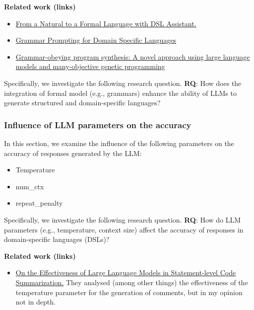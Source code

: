 \textbf{Related work (links)}
\begin{itemize}
    \item \href{https://dl.acm.org/doi/10.1145/3652620.3687811}{From a Natural to a Formal Language with DSL Assistant.}
    \item \href{https://proceedings.neurips.cc/paper_files/paper/2023/file/cd40d0d65bfebb894ccc9ea822b47fa8-Paper-Conference.pdf}{Grammar Prompting for Domain Specific Languages}
    \item \href{https://www.sciencedirect.com/science/article/abs/pii/S0920548924001077}{Grammar-obeying program synthesis: A novel approach using large language models and many-objective genetic programming}
\end{itemize}

Specifically, we investigate the following research question.
\textbf{RQ}: How does the integration of formal model (e.g., grammars) enhance the ability of LLMs to generate structured and domain-specific languages?

\subsubsection{Influence of LLM parameters on the accuracy}
In this section, we examine the influence of the following parameters on the accuracy of responses generated by the LLM:

\begin{itemize}
    \item Temperature
    \item num\_ctx
    \item repeat\_penalty
\end{itemize}

Specifically, we investigate the following research question.
\textbf{RQ}: How do LLM parameters (e.g., temperature, context size) affect the accuracy of responses in domain-specific languages (DSLs)?

\textbf{Related work (links)}
\begin{itemize}
    \item \href{https://ieeexplore.ieee.org/document/10684656}{On the Effectiveness of Large Language Models in Statement-level Code Summarization.} They analysed (among other things) the effectiveness of the temperature parameter for the generation of comments, but in my opinion not in depth.
\end{itemize}
